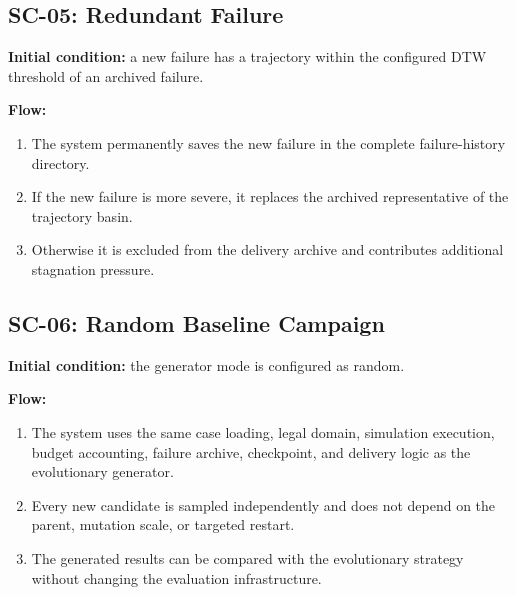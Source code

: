 \documentclass[11pt,a4paper]{report}
\begin{document}
\subsection{SC-05: Redundant Failure}
\textbf{Initial condition:} a new failure has a trajectory within the configured DTW threshold of an archived failure.

\textbf{Flow:}
\begin{enumerate}
  \item The system permanently saves the new failure in the complete failure-history directory.
  \item If the new failure is more severe, it replaces the archived representative of the trajectory basin.
  \item Otherwise it is excluded from the delivery archive and contributes additional stagnation pressure.
\end{enumerate}

\subsection{SC-06: Random Baseline Campaign}
\textbf{Initial condition:} the generator mode is configured as random.

\textbf{Flow:}
\begin{enumerate}
  \item The system uses the same case loading, legal domain, simulation execution, budget accounting, failure archive, checkpoint, and delivery logic as the evolutionary generator.
  \item Every new candidate is sampled independently and does not depend on the parent, mutation scale, or targeted restart.
  \item The generated results can be compared with the evolutionary strategy without changing the evaluation infrastructure.
\end{enumerate}
\end{document}

